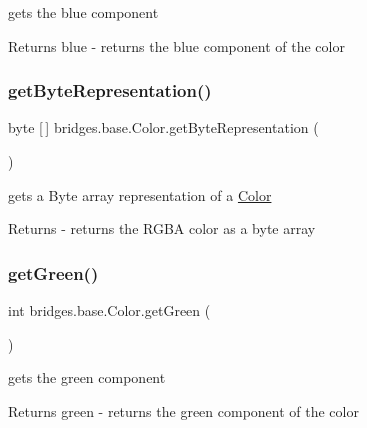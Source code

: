 gets the blue component

\begin{DoxyReturn}{Returns}
blue -\/ returns the blue component of the color 
\end{DoxyReturn}
\mbox{\label{classbridges_1_1base_1_1_color_a07215c888a6d17374a3d862ff30d5f93}} 
\subsubsection{\texorpdfstring{getByteRepresentation()}{getByteRepresentation()}}
{\footnotesize\ttfamily byte \mbox{[}$\,$\mbox{]} bridges.\+base.\+Color.\+get\+Byte\+Representation (\begin{DoxyParamCaption}{ }\end{DoxyParamCaption})}

gets a Byte array representation of a \mbox{\hyperlink{classbridges_1_1base_1_1_color}{Color}}

\begin{DoxyReturn}{Returns}
-\/ returns the R\+G\+BA color as a byte array 
\end{DoxyReturn}
\mbox{\label{classbridges_1_1base_1_1_color_a8f3fdd23cf785704faa2e3701e25978f}} 
\subsubsection{\texorpdfstring{getGreen()}{getGreen()}}
{\footnotesize\ttfamily int bridges.\+base.\+Color.\+get\+Green (\begin{DoxyParamCaption}{ }\end{DoxyParamCaption})}

gets the green component

\begin{DoxyReturn}{Returns}
green -\/ returns the green component of the color 
\end{DoxyReturn}
\mbox{\label{classbridges_1_1base_1_1_color_aced9bc89248b85686ba5385472974fe6}} 

